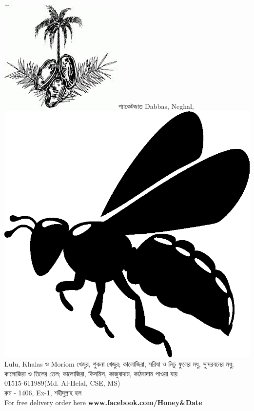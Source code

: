 \documentclass{article}
\begin{document}
\centering
{}
{{\fontsize{40}{48} \includegraphics[scale=0.2]{Image/date.jpeg}\selectfont প্যাকেটজাত  Dabbas, Neghal,\includegraphics[scale=0.05]{Image/bee2.png} Lulu, Khalas  ও Moriom খেজুর, শুকনা খেজুর; কালোজিরা, সরিষা ও  লিচু ফুলের মধু, সুন্দরবনের মধু; কালোজিরা ও তিলের তেল; কালোজিরা, কিসমিস, কাজুবাদাম, কাঠবাদাম  পাওয়া যায়\\}{\fontsize{36}{43.2}\selectfont {}01515-611989(Md. Al-Helal, CSE, MS)\\  রুম - 1406, Ex-1, শহীদুল্লাহ হল\\} {\fontsize{20}{24} \selectfont {} For free delivery order here \textbf{www.facebook.com/Honey\&Date}\\}\vspace{1.1cm}}
\end{document}
